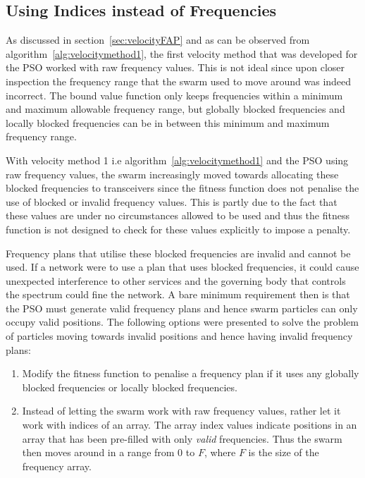 \subsection{Using Indices instead of Frequencies}
\label{sec:velocityFAP2}
As discussed in section~\ref{sec:velocityFAP} and as can be observed from algorithm~\ref{alg:velocitymethod1}, the first velocity method that was developed for the \gls{PSO} worked with raw frequency values. This is not ideal since upon closer inspection the frequency range that the swarm used to move around was indeed incorrect. The bound value function only keeps frequencies within a minimum and maximum allowable frequency range, but globally blocked frequencies and locally blocked frequencies can be in between this minimum and maximum frequency range. 

With velocity method 1 i.e algorithm~\ref{alg:velocitymethod1} and the \gls{PSO} using raw frequency values, the swarm increasingly moved towards allocating these blocked frequencies to transceivers since the fitness function does not penalise the use of blocked or invalid frequency values. This is partly due to the fact that these values are under no circumstances allowed to be used and thus the fitness function is not designed to check for these values explicitly to impose a penalty.

Frequency plans that utilise these blocked frequencies are invalid and cannot be used. If a network were to use a plan that uses blocked frequencies, it could cause unexpected interference to other services and the governing body that controls the spectrum could fine the network. A bare minimum requirement then is that the \gls{PSO} must generate valid frequency plans and hence swarm particles can only occupy valid positions. The following options were presented to solve the problem of particles moving towards invalid positions and hence having invalid frequency plans:
\begin{enumerate}
\item Modify the fitness function to penalise a frequency plan if it uses any globally blocked frequencies or locally blocked frequencies.
\item Instead of letting the swarm work with raw frequency values, rather let it work with indices of an array. The array index values indicate positions in an array that has been pre-filled with only \emph{valid} frequencies. Thus the swarm then moves around in a range from 0 to $F$, where $F$ is the size of the frequency array.
\end{enumerate}

